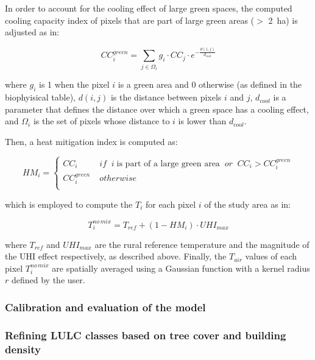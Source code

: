 \documentclass[10pt,letterpaper]{article}
\begin{document}
In order to account for the cooling effect of large green spaces, the computed cooling capacity index of pixels that are part of large green areas ($>$ 2~ha) is adjusted as in:

\begin{equation}
  \label{eq:cooling-capacity-green}
  CC_i^{green} = \sum_{j \in \Omega_i} g_i \cdot CC_j \cdot e^{-\frac{d(i, j)}{d_{cool}}}
\end{equation}

where $g_i$ is 1 when the pixel $i$ is a green area and 0 otherwise (as defined in the biophyisical table), $d(i, j)$ is the distance between pixels $i$ and $j$, $d_{cool}$ is a parameter that defines the distance over which a green space has a cooling effect, and $\Omega_i$ is the set of pixels whose distance to $i$ is lower than $d_{cool}$.

Then, a heat mitigation index is computed as:

\begin{equation}
  \label{eq:heat-mitigation index}
  HM_i = \begin{cases}
    CC_i & \; if \;\; i \; \textrm{is part of a large green area} \;\; or \;\; CC_i > CC_i^{green} \\[.5em]
    CC_i^{green} & \; otherwise \\
    \end{cases}
\end{equation}

which is employed to compute the $T_i$ for each pixel $i$ of the study area as in:

\begin{equation}
  \label{eq:tair-nomix}
  T_i^{no \, mix} = T_{ref} + (1 - HM_i) \cdot UHI_{max}
\end{equation}

where $T_{ref}$ and $UHI_{max}$ are the rural reference temperature and the magnitude of the UHI effect respectively, as described above.
Finally, the $T_{air}$ values of each pixel $T_i^{no \, mix}$ are spatially averaged using a Gaussian function with a kernel radius $r$ defined by the user.


\subsubsection*{Calibration and evaluation of the model}




\subsubsection*{Refining LULC classes based on tree cover and building density}
\label{sec:refin-lulc-class}
\end{document}
